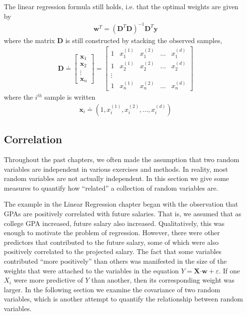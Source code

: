\documentclass[11pt,letterpaper]{article}
\newcommand\eps{\varepsilon}
\numberwithin{theorem}{section}
\numberwithin{definition}{section}
\numberwithin{lemma}{section}
\numberwithin{corollary}{section}
\numberwithin{proposition}{section}
\theoremstyle{definition}
\numberwithin{remark}{section}
\numberwithin{claim}{section}
\numberwithin{observation}{section}
\numberwithin{fact}{section}
\numberwithin{assumption}{section}
\numberwithin{example}{section}
\numberwithin{exercise}{section}
\begin{document}
The linear regression formula still holds, i.e. that the optimal weights are given by
\begin{align*}
\textbf{w}^T = (\textbf{D}^T \textbf{D})^{-1} \textbf{D}^T \textbf{y}
\end{align*}
where the matrix \textbf{D} is still constructed by stacking the observed samples,
\begin{align*}
\textbf{D} \doteq \begin{bmatrix}
\textbf{x}_1 \\
\textbf{x}_2 \\
\vdots \\
\textbf{x}_n
\end{bmatrix} = 
\begin{bmatrix}
1 & x_1^{(1)} & x_1^{(2)} & \dots &x_1^{(d)} \\
1 & x_2^{(1)} & x_2^{(2)} & \dots &x_2^{(d)} \\
\vdots \\
1 & x_n^{(1)} & x_n^{(2)} & \dots &x_n^{(d)}
\end{bmatrix}
\end{align*}
where the $i^{th}$ sample is written
\begin{align*}
\textbf{x}_i \doteq (1,x_i^{(1)},x_i^{(2)},\dots,x_i^{(d)})
\end{align*}

\newpage

\subsection{Correlation}

Throughout the past chapters, we often made the assumption that two random variables are independent in various exercises and methods. In reality, most random variables are not actually independent. In this section we give some measures to quantify how ``related'' a collection of random variables are.

The example in the Linear Regression chapter began with the observation that GPAs are positively correlated with future salaries. That is, we assumed that as college GPA increased, future salary also increased. Qualitatively, this was enough to motivate the problem of regression. However, there were other predictors that contributed to the future salary, some of which were also positively correlated to the projected salary. The fact that some variables contributed ``more positively'' than others was manifested in the size of the weights that were attached to the variables in the equation $Y = \textbf{X} \boldsymbol{\cdot} \textbf{w} + \eps$. If one $X_i$ were more predictive of $Y$ than another, then its corresponding weight was larger. In the following section we examine the covariance of two random variables, which is another attempt to quantify the relationship between random variables. 
\end{document}
